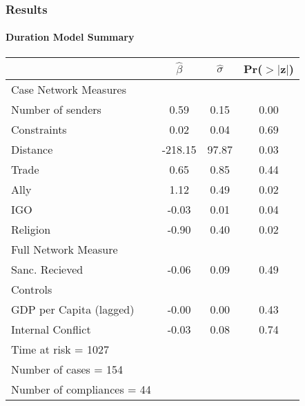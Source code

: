 \documentclass{beamer}
\begin{document}
\begin{frame}
\frametitle{Results}
\framesubtitle{Duration Model Summary}

\footnotesize{
	\begin{table}[ht]
		\begin{center}
		\begin{tabular}{lccc}
		  \hline\hline
		 &$\hat{\beta}$&$\hat{\sigma}$& Pr($>$$|$z$|$) \\ 
		  \hline
		  Case Network Measures \\
		  \;\;\;   Number of senders & 0.59 & 0.15 & 0.00 \\ 
		  \;\;\;   Constraints & 0.02 & 0.04 & 0.69 \\ 
		  \;\;\;   Distance & -218.15 & 97.87 & 0.03 \\
		  \;\;\;   Trade & 0.65 & 0.85 & 0.44 \\ 
		  \;\;\;   Ally & 1.12 & 0.49 & 0.02 \\ 
		  \;\;\;   IGO & -0.03 & 0.01 & 0.04 \\ 
		  \;\;\;   Religion & -0.90 & 0.40 & 0.02 \\ 
		  Full Network Measure \\
		  \;\;\;     Sanc. Recieved & -0.06 & 0.09 & 0.49 \\ 
		  Controls \\
		  \;\;\;     GDP per Capita (lagged) & -0.00 & 0.00 & 0.43 \\ 
		  \;\;\;     Internal Conflict & -0.03 & 0.08 & 0.74 \\ 
		   \hline
		   Time at risk = 1027 &&&\\
			 Number of cases = 154 &&&\\
		   Number of compliances = 44 &&&\\
		  \hline\hline
		\end{tabular}
		\end{center}
	\end{table}
}


\end{frame}

\end{document}

